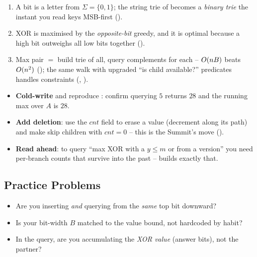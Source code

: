 \begin{insightbox}
\begin{enumerate}[nosep, leftmargin=1.6em]
  \item A bit is a letter from $\Sigma=\{0,1\}$; the string trie of  becomes a
        \emph{binary trie} the instant you read keys MSB-first ().
  \item XOR is maximised by the \emph{opposite-bit} greedy, and it is optimal because a high bit outweighs
        all low bits together ().
  \item Max pair $=$ build trie of all, query complements for each -- $O(nB)$ beats $O(n^2)$
        (); the same walk with upgraded ``is child available?'' predicates handles
        constraints (, ).
\end{enumerate}
\end{insightbox}

\begin{hardeningbox}
\begin{itemize}[nosep, leftmargin=1.4em]
  \item \textbf{Cold-write } and reproduce : confirm querying $5$
        returns $28$ and the running max over $A$ is $28$.
  \item \textbf{Add deletion}: use the $\mathit{cnt}$ field to erase a value (decrement along its path) and
        make  skip children with $\mathit{cnt}=0$ -- this is the Summit's move
        ().
  \item \textbf{Read ahead}: to query ``max XOR with a $y\le m$ or from a version'' you need per-branch
        counts that survive into the past --  builds exactly that.
\end{itemize}
\end{hardeningbox}

\subsection{Practice Problems}

\begin{stuckbox}
\begin{itemize}[nosep, leftmargin=1.4em]
  \item Are you inserting \emph{and} querying from the \emph{same} top bit downward?
  \item Is your bit-width $B$ matched to the value bound, not hardcoded by habit?
  \item In the query, are you accumulating the \emph{XOR value} (answer bits), not the partner?
\end{itemize}
\end{stuckbox}

